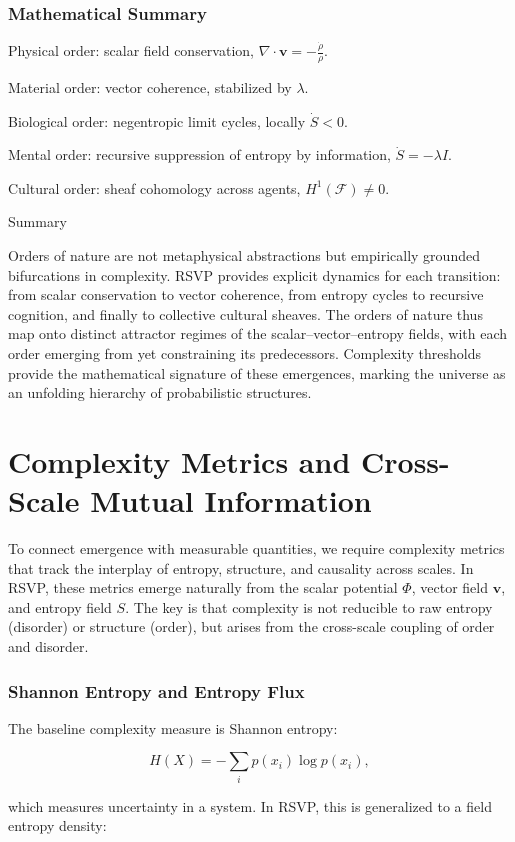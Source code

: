 \documentclass[12pt]{book}
\begin{document}
\subsection{Mathematical Summary}
Physical order: scalar field conservation, \( \nabla \cdot \mathbf{v} = -\frac{\dot{\rho}}{\rho} \).

Material order: vector coherence, stabilized by \( \lambda \).

Biological order: negentropic limit cycles, locally \( \dot{S} < 0 \).

Mental order: recursive suppression of entropy by information, \( \dot{S} = - \lambda I \).

Cultural order: sheaf cohomology across agents, \( H^1(\mathcal{F}) \neq 0 \).

Summary

Orders of nature are not metaphysical abstractions but empirically grounded bifurcations in complexity. RSVP provides explicit dynamics for each transition: from scalar conservation to vector coherence, from entropy cycles to recursive cognition, and finally to collective cultural sheaves. The orders of nature thus map onto distinct attractor regimes of the scalar–vector–entropy fields, with each order emerging from yet constraining its predecessors. Complexity thresholds provide the mathematical signature of these emergences, marking the universe as an unfolding hierarchy of probabilistic structures.

\chapter{Complexity Metrics and Cross-Scale Mutual Information}
To connect emergence with measurable quantities, we require complexity metrics that track the interplay of entropy, structure, and causality across scales. In RSVP, these metrics emerge naturally from the scalar potential \( \Phi \), vector field \( \mathbf{v} \), and entropy field \( S \). The key is that complexity is not reducible to raw entropy (disorder) or structure (order), but arises from the cross-scale coupling of order and disorder.

\subsection{Shannon Entropy and Entropy Flux}
The baseline complexity measure is Shannon entropy:

\[ H(X) = - \sum_i p(x_i) \log p(x_i), \]

which measures uncertainty in a system. In RSVP, this is generalized to a field entropy density:
\end{document}
